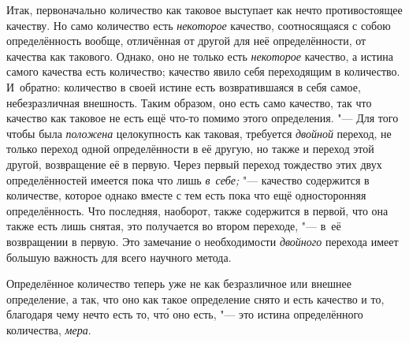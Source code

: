 Итак, первоначально количество как таковое выступает как нечто противостоящее
качеству. Но само количество есть {\em некоторое} качество, соотносящаяся
с собою определённость вообще, отличённая от другой для неё определённости,
от качества как такового. Однако, оно не только есть {\em некоторое} качество,
а истина самого качества есть количество; качество явило себя переходящим
в количество. И~обратно: количество в своей истине есть возвратившаяся в себя
самое, небезразличная внешность. Таким образом, оно есть само качество, так что
качество как таковое не есть ещё что-то помимо этого определения. "--- Для того
чтобы была {\em положена} целокупность как таковая, требуется {\em двойной}
переход, не только переход одной определённости в её другую, но также и переход
этой другой, возвращение её в первую. Через первый переход тождество этих двух
определённостей имеется пока что лишь {\em в~себе;} "--- качество содержится
в количестве, которое однако вместе с тем есть пока что ещё односторонняя
определённость. Что последняя, наоборот, также содержится в первой, что она
также есть лишь снятая, это получается во втором переходе, "--- в~её
возвращении в первую. Это замечание о необходимости {\em двойного} перехода
имеет большую важность для всего научного метода.

Определённое количество теперь уже не как безразличное или внешнее определение,
а так, что оно как такое определение снято и есть качество и то, благодаря чему
нечто есть то, чт\'{о} оно есть, "--- это истина определённого количества,
{\em мера}.

\subsubsection[Примечание]{}

